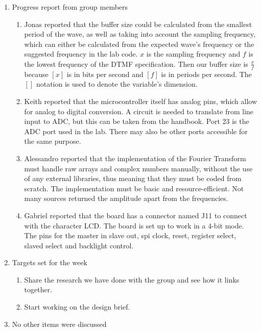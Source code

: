 \documentclass{cce2014-meetings}
\begin{document}
\begin{enumerate}
      \item Progress report from group members
            \begin{enumerate}
                  \item Jonas reported that the buffer size could be calculated from the
                        smallest period of the wave, as well as taking into account the
                        sampling frequency, which can either be calculated from the expected
                        wave's frequency or the suggested frequency in the lab code. $x$ is
                        the sampling frequency and $f$ is the lowest frequency of the DTMF
                        specification. Then our buffer size is $\frac{x}{f}$ because $[x]$ is
                        in bits per second and $[f]$ is in periods per second. The $[]$
                        notation is used to denote the variable's dimension.
                  \item Keith reported that the microcontroller itself has analog pins,
                        which allow for analog to digital conversion. A circuit is needed
                        to translate from line input to ADC, but this can be taken from the
                        handbook. Port 23 is the ADC port used in the lab. There may also be
                        other ports accessible for the same purpose.
                  \item Alessandro reported that the implementation of the Fourier Transform
                        must handle raw arrays and complex numbers manually, without the use
                        of any external libraries, thus meaning that they must be coded from
                        scratch. The implementation must be basic and resource-efficient. Not
                        many sources returned the amplitude apart from the frequencies.
                  \item Gabriel reported that the board has a connector named J11 to connect
                        with the character LCD. The board is set up to work in a 4-bit mode.
                        The pins for the master in slave out, spi clock, reset, register
                        select, slaved select and backlight control.
            \end{enumerate}

      \item Targets set for the week
            \begin{enumerate}
                  \item Share the research we have done with the group and see how it links together.
                  \item Start working on the design brief.
            \end{enumerate}
            
      \item No other items were discussed
\end{enumerate}
\end{document}
